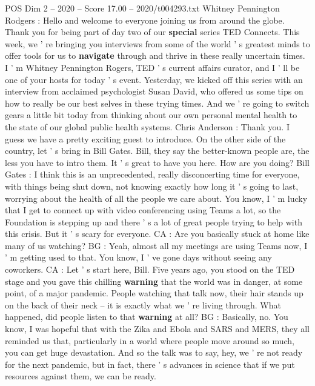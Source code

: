 \begin{textsample}{POS Dim 2 – 2020 – Score 17.00 – 2020/t004293.txt}  \label{ex:f2_pos_014}
Whitney Pennington Rodgers : Hello and welcome to everyone joining us from around the globe.
Thank you for being part of day two of our \textbf{special} series TED Connects.
This week, we ' re bringing you interviews from some of the world ' s greatest minds to offer tools for us to \textbf{navigate} through and thrive in these really uncertain times.
I ' m Whitney Pennington Rogers, TED ' s current affairs curator, and I ' ll be one of your hosts for today ' s event.
Yesterday, we kicked off this series with an interview from acclaimed psychologist Susan David, who offered us some tips on how to really be our best selves in these trying times.
And we ' re going to switch gears a little bit today from thinking about our own personal mental health to the state of our global public health systems.
Chris Anderson : Thank you.
I guess we have a pretty exciting guest to introduce.
On the other side of the country, let ' s bring in Bill Gates.
Bill, they say the better-known people are, the less you have to intro them.
It ' s great to have you here.
How are you doing?
Bill Gates : I think this is an unprecedented, really disconcerting time for everyone, with things being shut down, not knowing exactly how long it ' s going to last, worrying about the health of all the people we care about.
You know, I ' m lucky that I get to connect up with video conferencing using Teams a lot, so the Foundation is stepping up and there ' s a lot of great people trying to help with this crisis.
But it ' s scary for everyone.
CA : Are you basically stuck at home like many of us watching?
BG : Yeah, almost all my meetings are using Teams now, I ' m getting used to that.
You know, I ' ve gone days without seeing any coworkers.
CA : Let ' s start here, Bill.
Five years ago, you stood on the TED stage and you gave this chilling \textbf{warning} that the world was in danger, at some point, of a major pandemic.
People watching that talk now, their hair stands up on the back of their neck -- it is exactly what we ' re living through.
What happened, did people listen to that \textbf{warning} at all?
BG : Basically, no.
You know, I was hopeful that with the Zika and Ebola and SARS and MERS, they all reminded us that, particularly in a world where people move around so much, you can get huge devastation.
And so the talk was to say, hey, we ' re not ready for the next pandemic, but in fact, there ' s advances in science that if we put resources against them, we can be ready.

\end{textsample}
